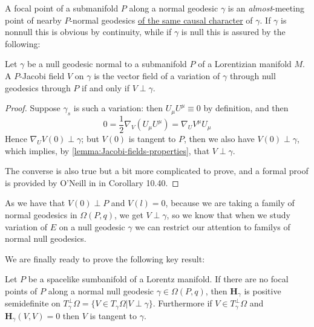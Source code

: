 A focal point of a submanifold \(P\) along a normal geodesic \(\gamma\) is an \emph{almost}-meeting point of nearby \(P\)-normal geodesics \underline{of the same causal character} of \(\gamma\). If \(\gamma\) is nonnull this is obvious by continuity, while if \(\gamma\) is null this is assured by the following:
\begin{corollary}
	Let \(\gamma\) be a null geodesic normal to a submanifold \(P\) of a Lorentizian manifold \(M\). A \(P\)-Jacobi field \(V\) on \(\gamma\) is the vector field of a variation of \(\gamma\) through null geodesics through \(P\) if and only if \(V \perp \gamma\).
\end{corollary}

\begin{proof}
	Suppose \(\gamma_s\) is such a variation: then \(U_{\mu}U^{\mu}\equiv 0\) by definition, and then
	\[
	0 = \frac{1}{2}\nabla_V(U_{\mu}U^{\mu}) = \nabla_UV^{\mu}U_{\mu}
	\]
	Hence \(\nabla_UV(0) \perp \gamma\); but \(V(0)\) is tangent to \(P\), then we also have \(V(0) \perp \gamma\), which implies, by \ref{lemma:Jacobi-fields-properties}, that \(V \perp \gamma\).
	
	The converse is also true but a bit more complicated to prove, and a formal proof is provided by O'Neill in \cite{o1983semi} in Corollary 10.40.
\end{proof}

As we have that \(V(0) \perp P\) and \(V(l) = 0\), because we are taking a family of normal geodesics in \(\Omega(P, q)\), we get \(V \perp \gamma\), so we know that when we study variation of \(E\) on a null geodesic \(\gamma\) we can restrict our attention to familys of normal null geodesics.

We are finally ready to prove the following key result:
\begin{prop}
	Let \(P\) be a spacelike sumbanifold of a Lorentz manifold. If there are no focal points of \(P\) along a normal null geodesic \(\gamma\in\Omega(P,q)\), then \(\textbf{H}_\gamma\) is positive semidefinite on \(T_{\gamma}^{\perp}\Omega = \{V \in T_{\gamma}\Omega \vert V \perp \gamma\}\). Furthermore if \(V \in T_{\gamma}^{\perp}\Omega \) and \(\textbf{H}_\gamma(V, V) = 0\) then \(V\) is tangent to \(\gamma\).
\end{prop}

